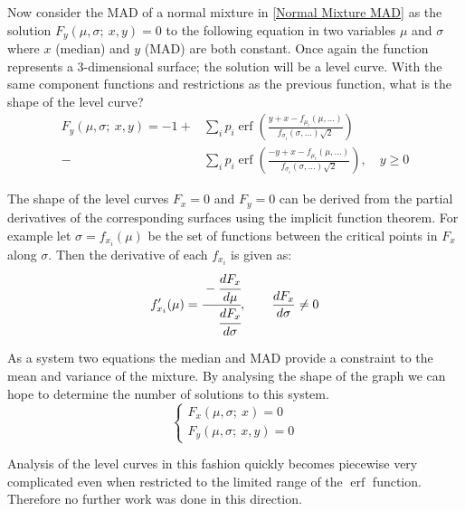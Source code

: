 \documentclass{article}
\DeclareMathOperator\erf{erf}
\begin{document}
Now consider the MAD of a normal mixture in \ref{Normal Mixture MAD} as the solution $F_y(\mu, \sigma;\ x,y) = 0$ to the following equation in two variables $\mu$ and $\sigma$ where $x$ (median) and $y$ (MAD) are both constant. Once again the function represents a 3-dimensional surface; the solution will be a level curve. With the same component functions and restrictions as the previous function, what is the shape of the level curve?
%
\begin{equation}\label{Normal Mixture MAD Function}
\begin{split}
F_y(\mu, \sigma;\ x, y) = -1 +
&   \sum_i p_i \erf \left( \frac
        {y + x - f_{\mu_i}(\mu, \ldots)}
        {f_{\sigma_i}(\sigma, \ldots)\sqrt{2}}
    \right) \\
    -
&   \sum_i p_i \erf \left( \frac
        {-y + x - f_{\mu_i}(\mu, \ldots)}
        {f_{\sigma_i}(\sigma, \ldots)\sqrt{2}}
    \right)
,   \quad y \geq 0
\end{split}
\end{equation}

The shape of the level curves $F_x = 0$ and $F_y = 0$ can be derived from the partial derivatives of the corresponding surfaces using the implicit function theorem. For example let $\sigma = f_{x_i}(\mu)$ be the set of functions between the critical points in $F_x$ along $\sigma$. Then the derivative of each $f_{x_i}$ is given as:
%
\begin{equation}\label{Implicit Function Theorem Example}
\begin{split}
f_{x_i}'(\mu) = \cfrac
    {\hfill- \cfrac{dF_x}{d\mu}}
    {\hfill\cfrac{dF_x}{d\sigma}}
    ,\qquad \frac{dF_x}{d\sigma} \neq 0
\end{split}
\end{equation}

As a system two equations the median and MAD provide a constraint to the mean and variance of the mixture. By analysing the shape of the graph we can hope to determine the number of solutions to this system.
%
\begin{equation}\label{Median & MAD Constraint to Mean & Variance}
\begin{cases}
    F_x(\mu, \sigma;\ x) = 0 \\
    F_y(\mu, \sigma;\ x,y) = 0
\end{cases}
\end{equation}

Analysis of the level curves in this fashion quickly becomes piecewise very complicated even when restricted to the limited range of the $\erf$ function. Therefore no further work was done in this direction.
\end{document}

